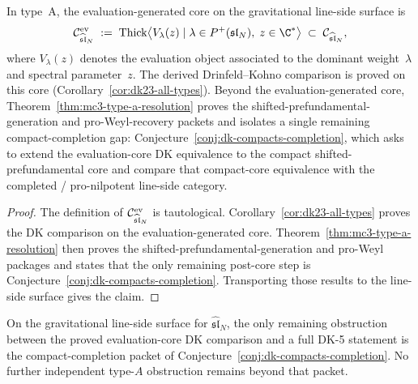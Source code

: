 \begin{theorem}
\label{thm:thqg-V-mc3-thick-generation}
In type~A, the evaluation-generated core on the gravitational
line-side surface is
\begin{equation}\label{eq:thqg-V-mc3-generation}
\cC^{\mathrm{ev}}_{\widehat{\mathfrak{sl}}_N}
\;:=\;
\mathrm{Thick}\bigl\langle
 V_\lambda(z) \mid \lambda \in P^+(\mathfrak{sl}_N),\;
 z \in \C^*
\bigr\rangle
\;\subset\;
\cC_{\widehat{\mathfrak{sl}}_N},
\end{equation}
where $V_\lambda(z)$ denotes the evaluation object associated to the
dominant weight~$\lambda$ and spectral parameter~$z$. The derived
Drinfeld--Kohno comparison is proved on this core
\textup{(}Corollary~\textup{\ref{cor:dk23-all-types})}. Beyond the
evaluation-generated core, Theorem~\ref{thm:mc3-type-a-resolution}
proves the shifted-prefundamental-generation and pro-Weyl-recovery
packets and isolates a single remaining compact-completion gap:
Conjecture~\ref{conj:dk-compacts-completion}, which asks to extend the
evaluation-core DK equivalence to the compact shifted-prefundamental
core and compare that compact-core equivalence with the completed /
pro-nilpotent line-side category.
\end{theorem}

\begin{proof}
The definition of $\mathcal{C}^{\mathrm{ev}}_{\widehat{\mathfrak{sl}}_N}$ is
tautological. Corollary~\ref{cor:dk23-all-types} proves the DK
comparison on the evaluation-generated core. Theorem~\ref{thm:mc3-type-a-resolution}
then proves the shifted-prefundamental-generation and pro-Weyl
packages and states that the only remaining post-core step is
Conjecture~\ref{conj:dk-compacts-completion}. Transporting those
results to the line-side surface gives the claim.
\end{proof}

\begin{corollary}
\label{cor:thqg-V-dk5-type-a}
On the gravitational line-side surface for
$\widehat{\mathfrak{sl}}_N$, the only remaining obstruction between the
proved evaluation-core DK comparison and a full DK-5 statement is the
compact-completion packet of
Conjecture~\ref{conj:dk-compacts-completion}. No further independent
type-$A$ obstruction remains beyond that packet.
\end{corollary}


